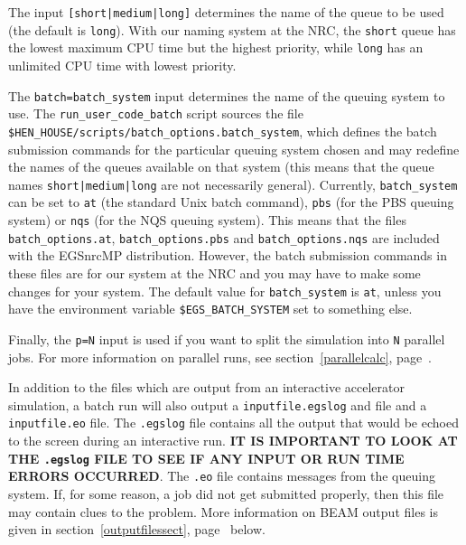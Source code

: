 \documentclass[12pt,twoside]{article}
\begin{document}
The input {\tt [short|medium|long]} determines the name of the queue to be used
(the default is {\tt long}).  With our naming system at the NRC,
the {\tt short} queue
has the lowest maximum CPU time but the highest priority, while {\tt long} has
an unlimited CPU time with lowest priority.

The {\tt batch=batch\_system} input
determines the name of the queuing system to use.  The
{\tt run\_user\_code\_batch} script sources the file
{\tt \$HEN\_HOUSE/scripts/batch\_options.batch\_system}, which defines
the batch submission commands for the particular queuing system chosen
and may redefine the names of the queues available on that system
(this means that the queue names {\tt short|medium|long} are not
necessarily general).  Currently, {\tt batch\_system} can be set to
{\tt at} (the standard Unix batch command), {\tt pbs} (for the
PBS queuing system) or {\tt nqs} (for the NQS queuing system).
This means that the files
{\tt batch\_options.at}, {\tt batch\_options.pbs} and
{\tt batch\_options.nqs} are included with the EGSnrcMP distribution.  However,
the batch submission commands in these files are for our system at the NRC
and you may have to make some changes for your system.  The default
value for {\tt batch\_system} is {\tt at}, unless you have the environment
variable {\tt \$EGS\_BATCH\_SYSTEM} set to something else.

Finally, the {\tt p=N} input is used if you want to split the simulation
into {\tt N} parallel jobs.  For more information on parallel runs,
see section~\ref{parallelcalc}, page~\pageref{parallelcalc}.

In addition to the files which are output from an interactive accelerator
simulation, a batch run will also output a {\tt inputfile.egslog} and
file and a
{\tt inputfile.eo} file.  The {\tt .egslog} file contains all the output
that would be echoed to the screen during an interactive run.  {\bfseries
IT IS IMPORTANT
TO LOOK AT THE {\tt .egslog} FILE TO SEE IF ANY INPUT OR RUN TIME ERRORS
OCCURRED}.  The {\tt .eo} file contains messages from the queuing system.  If,
for some reason, a job did not get submitted properly, then this file may
contain clues to the problem.  More information on BEAM output files is given
in section~\ref{outputfilessect}, page~\pageref{outputfilessect} below.
\end{document}
